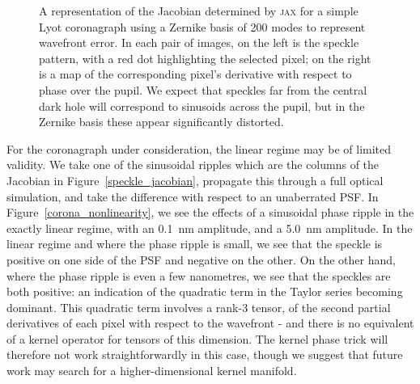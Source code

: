 \documentclass[modern]{aastex63}
\begin{document}


\begin{figure}
\caption{A representation of the Jacobian determined by \textsc{jax} for a simple Lyot coronagraph using a Zernike basis of 200 modes to represent wavefront error. In each pair of images, on the left is the speckle pattern, with a red dot highlighting the selected pixel; on the right is a map of the corresponding pixel's derivative with respect to phase over the pupil. We expect that speckles far from the central dark hole will correspond to sinusoids across the pupil, but in the Zernike basis these appear significantly distorted. \label{speckle_jacobian_zernike}}
\end{figure}

For the coronagraph under consideration, the linear regime may be of limited validity. We take one of the sinusoidal ripples which are the columns of the Jacobian in Figure~\ref{speckle_jacobian}, propagate this through a full optical simulation, and take the difference with respect to an unaberrated PSF. In Figure~\ref{corona_nonlinearity}, we see the effects of a sinusoidal phase ripple in the exactly linear regime, with an 0.1~nm amplitude, and a 5.0~nm amplitude. In the linear regime and where the phase ripple is small, we see that the speckle is positive on one side of the PSF and negative on the other. On the other hand, where the phase ripple is even a few nanometres, we see that the speckles are both positive: an indication of the quadratic term in the Taylor series becoming dominant. This quadratic term involves a rank-3 tensor, of the second partial derivatives of each pixel with respect to the wavefront - and there is no equivalent of a kernel operator for tensors of this dimension. The kernel phase trick will therefore not work straightforwardly in this case, though we suggest that future work may search for a higher-dimensional kernel manifold. 
\end{document}
